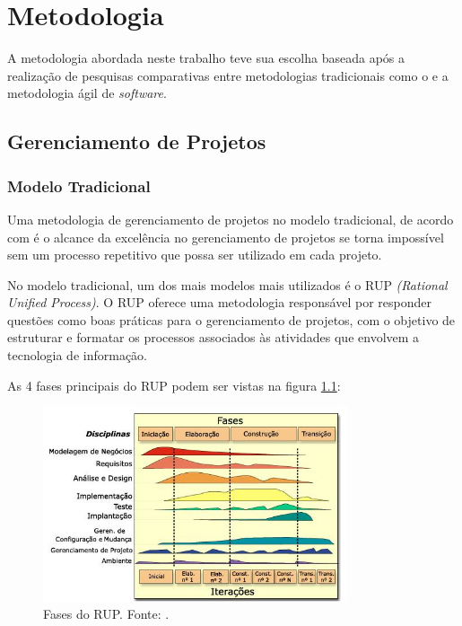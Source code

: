 \chapter[Metodologia]{Metodologia}
\label{cp:metodologia}

A metodologia abordada neste trabalho teve sua escolha baseada após a realização de pesquisas comparativas entre metodologias tradicionais como o \cite{pmbok} e a metodologia ágil de \textit{software}.

\section{Gerenciamento de Projetos}

\subsection{Modelo Tradicional}

Uma metodologia de gerenciamento de projetos no modelo tradicional, de acordo com \cite{kerzner} é o alcance da excelência no gerenciamento de projetos se torna impossível sem um processo repetitivo que possa ser utilizado em cada projeto.

No modelo tradicional, um dos mais modelos mais utilizados é o RUP \textit{(Rational Unified Process)}. O RUP oferece uma metodologia responsável por responder questões como boas práticas para o gerenciamento de projetos, com o objetivo de estruturar e formatar os processos associados às atividades que envolvem a tecnologia de informação. 

As 4 fases principais do RUP podem ser vistas na figura \ref{img:fases_do_rup}:

\begin{figure}[H]
	\centering
	\includegraphics[width=0.8\textwidth]{figuras/fases_rup.jpg}
	\caption{Fases do RUP. Fonte: \cite{rup}.}
	\label{img:fases_do_rup}
\end{figure}

